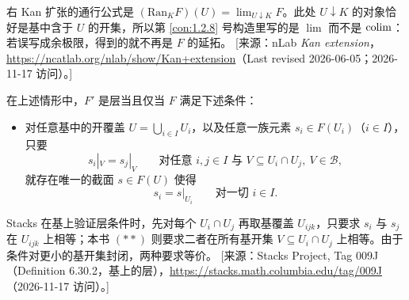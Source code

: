 \begin{yizhu}
右 Kan 扩张的通行公式是 $(\mathrm{Ran}_K F)(U)=\lim_{U\downarrow K}F$。此处 $U\downarrow K$ 的对象恰好是基中含于 $U$ 的开集，所以第 \ref{con:1.2.8} 号构造里写的是 $\lim$ 而不是 $\operatorname*{colim}$：若误写成余极限，得到的就不再是 $F$ 的延拓。
[来源：nLab \emph{Kan extension}，\url{https://ncatlab.org/nlab/show/Kan+extension}（Last revised 2026-06-05；2026-11-17 访问）。]
\end{yizhu}

\begin{proposition}\label{prop:1.2.10}
在上述情形中，$F'$ 是层当且仅当 $F$ 满足下述条件：
\begin{itemize}
  \item[$(**)$] 对任意基中的开覆盖 $U=\bigcup_{i\in I}U_i$，以及任意一族元素 $s_i\in F(U_i)$（$i\in I$），只要
  \[
  s_i|_V=s_j|_V\qquad\text{对任意 } i,j\in I \text{ 与 } V\subseteq U_i\cap U_j,\ V\in\mathcal B,
  \]
  就存在唯一的截面 $s\in F(U)$ 使得
  \[
  s_i=s|_{U_i}\qquad\text{对一切 } i\in I.
  \]
\end{itemize}
\end{proposition}

\begin{yizhu}
Stacks 在基上验证层条件时，先对每个 $U_i\cap U_j$ 再取基覆盖 $U_{ijk}$，只要求 $s_i$ 与 $s_j$ 在 $U_{ijk}$ 上相等；本书 $(**)$ 则要求二者在所有基开集 $V\subseteq U_i\cap U_j$ 上相等。由于条件对更小的基开集封闭，两种要求等价。
[来源：Stacks Project, Tag 009J（Definition 6.30.2，基上的层），\url{https://stacks.math.columbia.edu/tag/009J}（2026-11-17 访问）。]
\end{yizhu}

